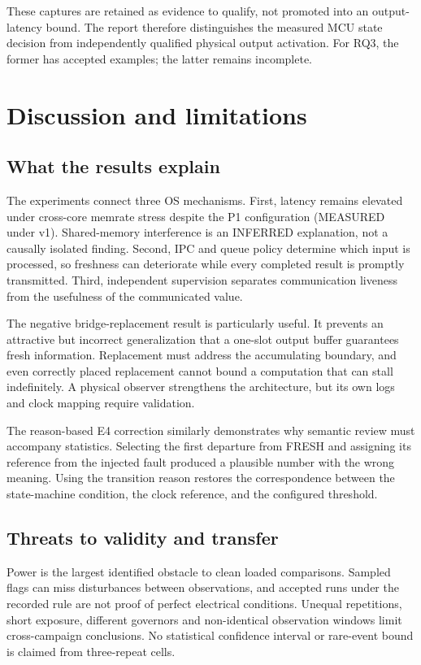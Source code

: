 \documentclass[a4paper,11pt]{article}
\newcommand{\page}{\clearpage}
\begin{document}
These captures are retained as evidence to qualify, not promoted into an output-latency bound. The report therefore distinguishes the measured MCU state decision from independently qualified physical output activation. For RQ3, the former has accepted examples; the latter remains incomplete.
\page
\section{Discussion and limitations}
\subsection{What the results explain}
The experiments connect three OS mechanisms. First, latency remains elevated under cross-core memrate stress despite the P1 configuration (MEASURED under v1). Shared-memory interference is an INFERRED explanation, not a causally isolated finding. Second, IPC and queue policy determine which input is processed, so freshness can deteriorate while every completed result is promptly transmitted. Third, independent supervision separates communication liveness from the usefulness of the communicated value.

The negative bridge-replacement result is particularly useful. It prevents an attractive but incorrect generalization that a one-slot output buffer guarantees fresh information. Replacement must address the accumulating boundary, and even correctly placed replacement cannot bound a computation that can stall indefinitely. A physical observer strengthens the architecture, but its own logs and clock mapping require validation.

The reason-based E4 correction similarly demonstrates why semantic review must accompany statistics. Selecting the first departure from FRESH and assigning its reference from the injected fault produced a plausible number with the wrong meaning. Using the transition reason restores the correspondence between the state-machine condition, the clock reference, and the configured threshold.
\subsection{Threats to validity and transfer}
Power is the largest identified obstacle to clean loaded comparisons. Sampled flags can miss disturbances between observations, and accepted runs under the recorded rule are not proof of perfect electrical conditions. Unequal repetitions, short exposure, different governors and non-identical observation windows limit cross-campaign conclusions. No statistical confidence interval or rare-event bound is claimed from three-repeat cells.
\end{document}

